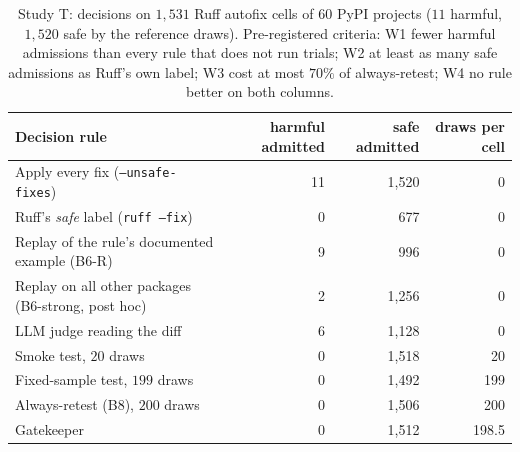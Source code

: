 \begin{table}[t]
\centering\footnotesize
\caption{Study T: decisions on $1{,}531$ Ruff autofix cells of $60$ PyPI projects ($11$ harmful, $1{,}520$ safe by the reference
draws).  Pre-registered criteria: W1 fewer harmful admissions than every rule that does not run trials; W2 at least as many
safe admissions as Ruff's own label; W3 cost at most $70\%$ of always-retest; W4 no rule better on both columns.}
\label{tab:market}
\begin{tabular}{@{}lrrr@{}}
\toprule
Decision rule & harmful admitted & safe admitted & draws per cell \\
\midrule
Apply every fix (\texttt{--unsafe-fixes}) & 11 & 1{,}520 & 0 \\
Ruff's \emph{safe} label (\texttt{ruff --fix}) & 0 & 677 & 0 \\
Replay of the rule's documented example (B6-R) & 9 & 996 & 0 \\
Replay on all other packages (B6-strong, post hoc) & 2 & 1{,}256 & 0 \\
LLM judge reading the diff & 6 & 1{,}128 & 0 \\
Smoke test, $20$ draws & 0 & 1{,}518 & 20 \\
Fixed-sample test, $199$ draws & 0 & 1{,}492 & 199 \\
Always-retest (B8), $200$ draws & 0 & 1{,}506 & 200 \\
Gatekeeper & 0 & 1{,}512 & 198.5 \\
\bottomrule
\end{tabular}
\end{table}


